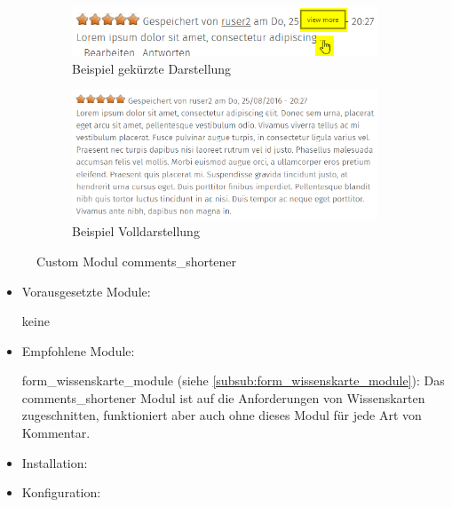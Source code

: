 \begin{figure}[H]
	\centering
	\begin{subfigure}{0.45\textwidth}
		\centering
		\includegraphics[width=0.95\linewidth]{images/example_commentsshortener}
		\caption[]{Beispiel gekürzte Darstellung}
		\label{fig:example_commentshortener_short}
	\end{subfigure}
	\begin{subfigure}{0.45\textwidth}
		\centering
		\includegraphics[width=0.95\linewidth]{images/example_commentsshortener_full}
		\caption[]{Beispiel Volldarstellung}
		\label{fig:example_commentshortener_full}
	\end{subfigure}
	\caption{Custom Modul comments\_shortener}
	\label{fig:example_commentsshortener}
\end{figure}

\begin{itemize}[parsep=0pt, itemsep=5.0pt plus 2.0pt minus 1.0pt, leftmargin=*]
	\item Vorausgesetzte Module:
	
	keine
	
	
	\item Empfohlene Module:
	
	form\_wissenskarte\_module (siehe \cref{subsub:form_wissenskarte_module}): Das comments\_shortener Modul ist auf die Anforderungen von Wissenskarten zugeschnitten, funktioniert aber auch ohne dieses Modul für jede Art von Kommentar.	
	
	
	\item Installation: \standardinstall
	
	\item Konfiguration:
	
	\noconfig
	
\end{itemize}



